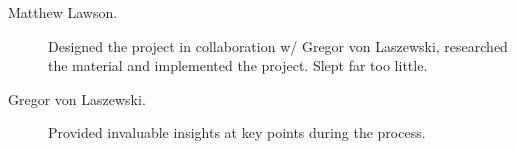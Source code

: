 \documentclass[9pt,twocolumn,twoside]{../../styles/osajnl}
\begin{document}
\appendix
\begin{description}

\item[Matthew Lawson.] Designed the project in collaboration w/ Gregor von Laszewski, researched the material and implemented the project.  Slept far too little.

\item[Gregor von Laszewski.] Provided invaluable insights at key points during the process.

\end{description}
\end{document}
